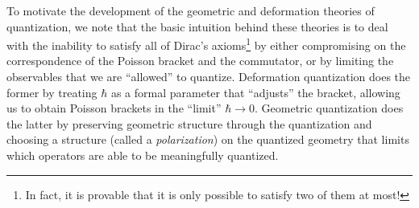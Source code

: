 \documentclass{tufte-handout}
\begin{document}
To motivate the development of the geometric and deformation theories of quantization, we note that the basic intuition behind these theories is to deal with the inability to satisfy all of Dirac's axioms\footnote{In fact, it is provable that it is only possible to satisfy two of them at most!} by either compromising on the correspondence of the Poisson bracket and the commutator, or by limiting the observables that we are ``allowed'' to quantize. Deformation quantization does the former by treating $\hbar$ as a formal parameter that ``adjusts'' the bracket, allowing us to obtain Poisson brackets in the ``limit'' $\hbar \to 0$. Geometric quantization does the latter by preserving geometric structure through the quantization and choosing a structure (called a \emph{polarization}) on the quantized geometry that limits which operators are able to be meaningfully quantized.



\end{document}
